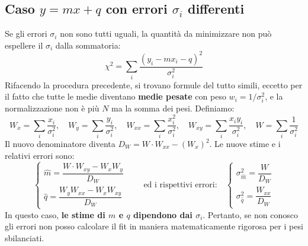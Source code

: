\documentclass[openany,a4paper,12pt]{book}
\theoremstyle{remark}
\begin{document}
\subsection{Caso \texorpdfstring{$y = mx + q$}{} con errori \texorpdfstring{$\sigma_i$}{} differenti}
Se gli errori $\sigma_i$ non sono tutti uguali, la quantità da minimizzare non può espellere il $\sigma_i$ dalla sommatoria:
\begin{equation}
    \chi^2 = \sum_i \frac{(y_i - m x_i - q)^2}{\sigma_i^2}
\end{equation}
Rifacendo la procedura precedente, si trovano formule del tutto simili, eccetto per il fatto che tutte le medie diventano \textbf{medie pesate} con peso $w_i = 1/\sigma_i^2$, e la normalizzazione non è più $N$ ma la somma dei pesi. Definiamo:
\begin{equation}
    W_x = \sum_i \frac{x_i}{\sigma_i^2}, \quad
    W_y = \sum_i \frac{y_i}{\sigma_i^2}, \quad
    W_{xx} = \sum_i \frac{x_i^2}{\sigma_i^2}, \quad      
    W_{xy} = \sum_i \frac{x_i y_i}{\sigma_i^2}, \quad
    W = \sum_i \frac{1}{\sigma_i^2}
\end{equation}
Il nuovo denominatore diventa $D_W = W \cdot W_{xx} - (W_x)^2$. Le nuove stime e i relativi errori sono:
\begin{equation}
    \begin{cases}
        \hat{m} = \dfrac{W \cdot W_{xy} - W_x W_y}{D_W} \\[3ex]
        \hat{q} = \dfrac{W_y W_{xx} - W_x W_{xy}}{D_W}
    \end{cases}
    \quad \quad \text{ed i rispettivi errori:} \quad
    \begin{cases}
        \sigma_{\hat{m}}^2 = \dfrac{W}{D_W} \\[3ex]
        \sigma_{\hat{q}}^2 = \dfrac{W_{xx}}{D_W}
    \end{cases}
\end{equation}
In questo caso, \textbf{le stime di $m$ e $q$ dipendono dai $\sigma_i$}. Pertanto, se non conosco gli errori non posso calcolare il fit in maniera matematicamente rigorosa per i pesi sbilanciati.
\end{document}
